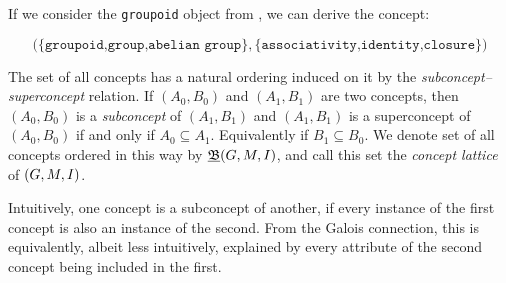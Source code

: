 \begin{example}
\label{example:formal-concept}
If we consider the \texttt{groupoid} object from , we can derive the concept:

\[\big(\{\texttt{groupoid,group,abelian group}\}, \{\texttt{associativity,identity,closure}\} \big)\]


\end{example}

The set of all concepts has a natural ordering induced on it by the \textit{subconcept--superconcept} relation. If $(A_0,B_0)$ and $(A_1,B_1)$ are two concepts, then $(A_0,B_0)$ is a \textit{subconcept} of $(A_1, B_1)$ and $(A_1, B_1)$ is a superconcept of $(A_0,B_0)$ if and only if $A_0 \subseteq A_1$. Equivalently if $B_1 \subseteq B_0$. We denote set of all concepts ordered in this way by $\underline{{\mathfrak B}} (G,M,\mathrel{I})$, and call this set the \textit{concept lattice} of $(G,M,\mathrel{I})$.

Intuitively, one concept is a subconcept of another, if every instance of the first concept is also an instance of the second. From the Galois connection, this is equivalently, albeit less intuitively, explained by every attribute of the second concept being included in the first.


